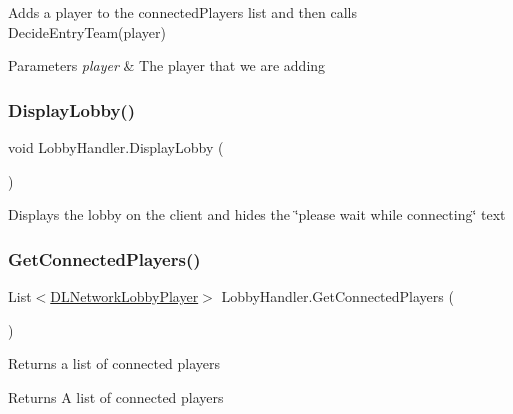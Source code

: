Adds a player to the connected\+Players list and then calls Decide\+Entry\+Team(player) 


\begin{DoxyParams}{Parameters}
{\em player} & The player that we are adding\\
\hline
\end{DoxyParams}
\hypertarget{class_lobby_handler_a93e035e5597d004874101d1f5cdccddb}{}\label{class_lobby_handler_a93e035e5597d004874101d1f5cdccddb} 
\subsubsection{\texorpdfstring{Display\+Lobby()}{DisplayLobby()}}
{\footnotesize\ttfamily void Lobby\+Handler.\+Display\+Lobby (\begin{DoxyParamCaption}{ }\end{DoxyParamCaption})}



Displays the lobby on the client and hides the \char`\"{}please wait while connecting\char`\"{} text 

\hypertarget{class_lobby_handler_ac928e312ab0287895f609e3f1785602c}{}\label{class_lobby_handler_ac928e312ab0287895f609e3f1785602c} 
\subsubsection{\texorpdfstring{Get\+Connected\+Players()}{GetConnectedPlayers()}}
{\footnotesize\ttfamily List$<$\hyperlink{class_d_l_network_lobby_player}{D\+L\+Network\+Lobby\+Player}$>$ Lobby\+Handler.\+Get\+Connected\+Players (\begin{DoxyParamCaption}{ }\end{DoxyParamCaption})}



Returns a list of connected players 

\begin{DoxyReturn}{Returns}
A list of connected players
\end{DoxyReturn}
\hypertarget{class_lobby_handler_adc9450a1e7af2b7ed8b643510c960afa}{}\label{class_lobby_handler_adc9450a1e7af2b7ed8b643510c960afa} 
